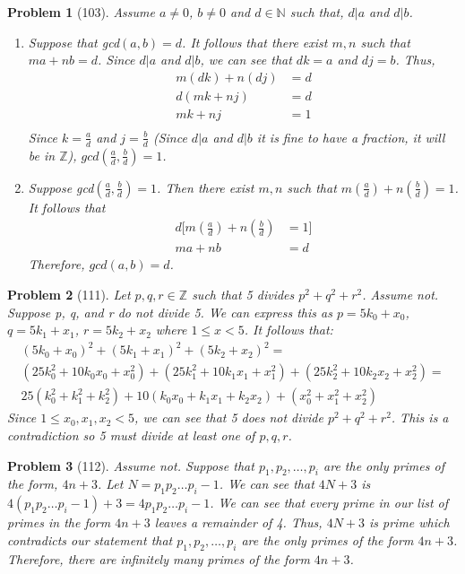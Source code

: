 \documentclass{article}
\theoremstyle{problem}
\newtheorem{prob}{Problem}
\theoremstyle{plain}
\theoremstyle{remark}
\begin{document}
%
\begin{prob}[103]
Assume $a \not = 0$, $b \not = 0$ and $d \in \mathbb{N}$ such that, $d|a$ and $d|b$.
\begin{enumerate}
\item[($\Rightarrow$)] Suppose that gcd$(a,b) = d$. It follows that there exist $m,n$ such that $ma + nb = d$. Since $d|a$ and $d|b$, we can see that $dk=a$ and $dj=b$. Thus, 
\begin{align*}
m(dk) + n(dj) &= d\\
d(mk + nj) &= d\\
mk + nj &= 1\\
\end{align*}
Since $k = \frac{a}{d}$ and $j = \frac{b}{d}$ (Since $d|a$ and $d|b$ it is fine to have a fraction, it will be in $\mathbb{Z}$),  $gcd(\frac{a}{d},\frac{b}{d}) = 1$.
\item[($\Leftarrow$)] Suppose gcd$(\frac{a}{d}, \frac{b}{d}) = 1$. Then there exist $m,n$ such that $m(\frac{a}{d}) + n(\frac{b}{d}) = 1$. It follows that 
\begin{align*}
  d[m(\frac{a}{d}) + n(\frac{b}{d}) &= 1]\\
  ma + nb &= d
\end{align*}
Therefore, $gcd(a,b) = d$.
\end{enumerate}
\end{prob}

%
\begin{prob}[111]
Let $p,q,r \in \mathbb{Z}$ such that 5 divides $p^2 + q^2 + r^2$. Assume not. Suppose p, q, and r do not divide 5. We can express this as $p = 5k_0 + x_0$, $q = 5k_1 + x_1$, $r = 5k_2 + x_2$ where $1 \leq x < 5$. It follows that:
\begin{align*}
  (5k_0 + x_0)^2 + (5k_1 + x_1)^2 + (5k_2 + x_2)^2 =\\
(25k_0^2 + 10k_0x_0 + x_0^2) + (25k_1^2 + 10k_1x_1 + x_1^2) + (25k_2^2 + 10k_2x_2 + x_2^2)= \\
25(k_0^2 + k_1^2 + k_2^2) + 10(k_0x_0+k_1x_1+k_2x_2) + (x_0^2 + x_1^2 + x_2^2)
\end{align*}
Since $1 \leq x_0, x_1, x_2 < 5$, we can see that 5 does not divide $p^2 + q^2 + r^2$. This is a contradiction so 5 must divide at least one of $p,q,r$. 
\end{prob}

%
\begin{prob}[112]
Assume not. Suppose that $p_1,p_2,\ldots,p_i$ are the only primes of the form, $4n+3$. Let $N = p_1 p_2 \ldots p_i -1$. We can see that $4N + 3$ is $4(p_1 p_2 \ldots p_i - 1) + 3 = 4p_1 p_2 \ldots p_i- 1$. We can see that every prime in our list of primes in the form $4n+3$ leaves a remainder of 4. Thus, $4N + 3$ is prime which contradicts our statement that $p_1,p_2,\ldots ,p_i$ are the only primes of the form $4n+3$. Therefore, there are infinitely many primes of the form $4n+3$.

\end{prob}
\end{document}
